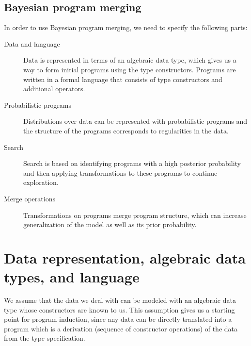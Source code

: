 \documentclass[a4paper,10pt]{article}
\begin{document}
\subsection{Bayesian program merging}


In order to use Bayesian program merging, we need to specify the following parts:

\begin{description}
\item[Data and language] Data is represented in terms of an algebraic data type, which gives us a way to form initial programs using the type constructors.  Programs are written in a formal language that consists of type constructors and additional operators.
\item[Probabilistic programs]  Distributions over data can be represented with probabilistic programs and the structure of the programs corresponds to regularities in the data.
\item[Search] Search is based on identifying programs with a high posterior probability and then applying transformations to these programs to continue exploration.
\item[Merge operations] Transformations on programs merge program structure, which can increase generalization of the model as well as its prior probability.
\end{description}


\newpage
\section{Data representation, algebraic data types, and language}
We assume that the data we deal with can be modeled with an algebraic data type whose constructors are known to us.  This assumption gives us a starting point for program induction, since any data can be directly translated into a program which is a derivation (sequence of constructor operations) of the data from the type specification. 
\end{document}
